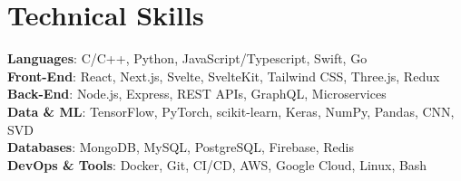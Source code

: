 \section{Technical Skills}
    \begin{itemize}[leftmargin=0.15in, label={}]
        \small{\item{
            \textbf{Languages}{: C/C++, Python, JavaScript/Typescript, Swift, Go} \\
            \textbf{Front-End}{: React, Next.js, Svelte, SvelteKit, Tailwind CSS, Three.js, Redux} \\
            \textbf{Back-End}{: Node.js, Express, REST APIs, GraphQL, Microservices} \\
            \textbf{Data \& ML}{: TensorFlow, PyTorch, scikit-learn, Keras, NumPy, Pandas, CNN, SVD} \\
            \textbf{Databases}{: MongoDB, MySQL, PostgreSQL, Firebase, Redis} \\
            \textbf{DevOps \& Tools}{: Docker, Git, CI/CD, AWS, Google Cloud, Linux, Bash}
        }}
    \end{itemize}
